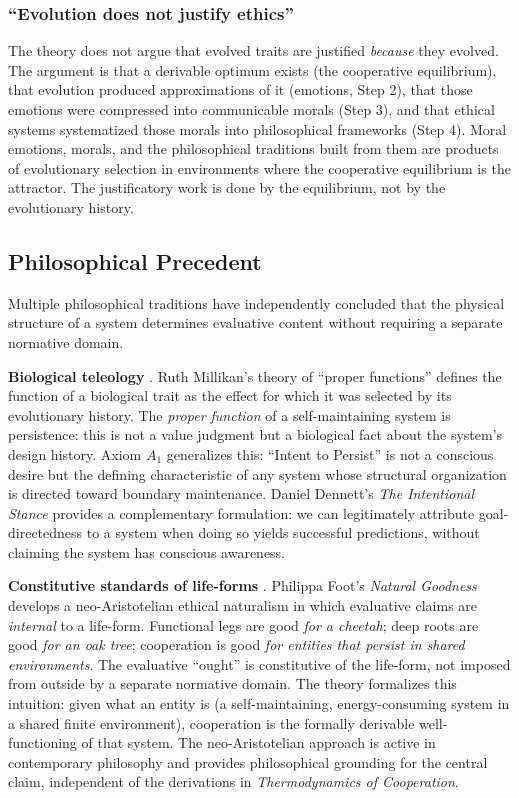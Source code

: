 \documentclass[11pt]{article}
\theoremstyle{plain}
\theoremstyle{definition}
\theoremstyle{remark}
\let\origsubsection\subsection
\renewcommand{\subsection}{\needspace{7\baselineskip}\origsubsection}
\let\origsubsubsection\subsubsection
\renewcommand{\subsubsection}{\needspace{4\baselineskip}\origsubsubsection}
\begin{document}
\subsubsection{``Evolution does not justify
ethics''}\label{evolution-does-not-justify-ethics}

The theory does not argue that evolved traits are justified
\emph{because} they evolved. The argument is that a derivable optimum
exists (the cooperative equilibrium), that evolution produced
approximations of it (emotions, Step 2), that those emotions were
compressed into communicable morals (Step 3), and that ethical systems
systematized those morals into philosophical frameworks (Step 4). Moral
emotions, morals, and the philosophical traditions built from them are
products of evolutionary selection in environments where the cooperative
equilibrium is the attractor. The justificatory work is done by the
equilibrium, not by the evolutionary history.

\subsection{Philosophical Precedent}\label{philosophical-precedent}

Multiple philosophical traditions have independently concluded that the
physical structure of a system determines evaluative content without
requiring a separate normative domain.

\textbf{Biological teleology} \citep{Millikan1984, Dennett1995}. Ruth
Millikan's theory of ``proper functions'' defines the function of a
biological trait as the effect for which it was selected by its
evolutionary history. The \emph{proper function} of a self-maintaining
system is persistence: this is not a value judgment but a biological
fact about the system's design history. Axiom \(A_1\) generalizes this:
``Intent to Persist'' is not a conscious desire but the defining
characteristic of any system whose structural organization is directed
toward boundary maintenance. Daniel Dennett's \emph{The Intentional
Stance} \citep{Dennett1987, Dennett1995} provides a complementary
formulation: we can legitimately attribute goal-directedness to a system
when doing so yields successful predictions, without claiming the system
has conscious awareness.

\textbf{Constitutive standards of life-forms}
\citep{Foot2001, Hursthouse1999}. Philippa Foot's \emph{Natural
Goodness} develops a neo-Aristotelian ethical naturalism in which
evaluative claims are \emph{internal} to a life-form. Functional legs
are good \emph{for a cheetah}; deep roots are good \emph{for an oak
tree}; cooperation is good \emph{for entities that persist in shared
environments}. The evaluative ``ought'' is constitutive of the
life-form, not imposed from outside by a separate normative domain. The
theory formalizes this intuition: given what an entity is (a
self-maintaining, energy-consuming system in a shared finite
environment), cooperation is the formally derivable well-functioning of
that system. The neo-Aristotelian approach is active in contemporary
philosophy \citep{Lutz2024} and provides philosophical grounding for the
central claim, independent of the derivations in \emph{Thermodynamics of
Cooperation}.
\end{document}

